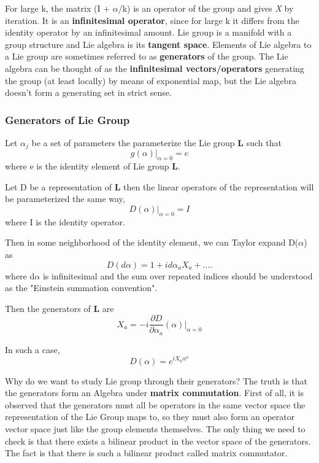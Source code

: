 For large k, the matrix (I + $\alpha$/k) is an operator of the group and gives \textit{X} by iteration. 
It is an \textbf{infinitesimal operator}, since for large k it diﬀers from the identity operator by an infinitesimal amount.
Lie group is a manifold with a group structure and Lie algebra is its \textbf{tangent space}.
Elements of Lie algebra to a Lie group are sometimes referred to as \textbf{generators} of the group.
The Lie algebra can be thought of as the \textbf{infinitesimal vectors/operators} generating the group (at least locally) by means of
exponential map, but the Lie algebra doesn't form a generating set in strict sense.

\subsubsection{Generators of Lie Group}
Let $\alpha_j$ be a set of parameters the parameterize the Lie group \textbf{L} such that 
\begin{equation}
    \textit{g}(\alpha)|_{\alpha=0} = e
\end{equation}
where e is the identity element of Lie group \textbf{L}.

Let D be a representation of \textbf{L} then the linear operators of the representation will be parameterized the same way,
\begin{equation}
    D(\alpha)|_{\alpha=0} = I
\end{equation}
where I is the identity operator.

Then in some neighborhood of the identity element, we can Taylor expand D($\alpha$) as
\begin{equation}
    D(d\alpha) = 1 + i d\alpha_a X_a + ....
\end{equation}
where d$\alpha$ is infinitesimal and the sum over repeated indices should be understood as the "Einstein summation convention".

Then the generators of \textbf{L} are
\begin{equation}
    X_a = -i \frac{\partial D}{\partial \alpha_a}(\alpha)\Big|_{\alpha=0}
\end{equation}

In such a case,
\begin{equation}
    D(\alpha) = e^{iX_a\alpha^a}
\end{equation}

Why do we want to study Lie group through their generators? 
The truth is that the generators form an Algebra under \textbf{matrix commutation}. First of all, it is observed that the generators must all be operators in the same vector space 
the representation of the Lie Group maps to, so they must also form an operator vector space just like the group elements themselves. 
The only thing we need to check is that there exists a bilinear product in the vector space of the generators. 
The fact is that there is such a bilinear product called matrix commutator.

